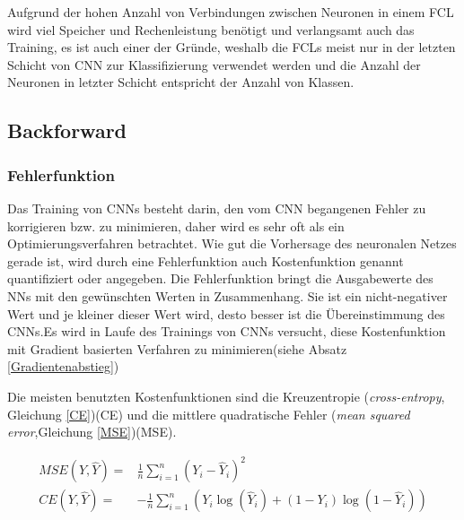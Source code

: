 \documentclass[12pt,a4paper]{scrartcl}
\numberwithin{equation}{section}
\begin{document}
Aufgrund der hohen Anzahl von Verbindungen zwischen Neuronen in einem \ac{FCL} wird viel Speicher und Rechenleistung benötigt und verlangsamt auch das Training, es ist auch einer der Gründe, weshalb die \acsp{FCL} meist nur in der letzten Schicht von \ac{CNN} zur Klassifizierung verwendet werden und die Anzahl der Neuronen in letzter Schicht entspricht der Anzahl von Klassen.









\subsection{Backforward }

\subsubsection{Fehlerfunktion}\label{Fehlerfunktion}

Das Training von \acsp{CNN} besteht darin, den vom \ac{CNN} begangenen Fehler zu korrigieren bzw. zu minimieren, daher wird es sehr oft als ein Optimierungsverfahren betrachtet.
Wie gut die Vorhersage des neuronalen Netzes gerade ist, wird durch eine Fehlerfunktion auch Kostenfunktion genannt quantifiziert oder angegeben.
Die Fehlerfunktion bringt die Ausgabewerte des \acsp{NN} mit den gewünschten Werten in Zusammenhang. Sie ist ein nicht-negativer Wert und je kleiner dieser Wert wird, desto besser ist die Übereinstimmung des \acsp{CNN}.Es wird in Laufe des Trainings von \acsp{CNN} versucht, diese Kostenfunktion mit Gradient basierten Verfahren zu minimieren(siehe Absatz \ref{Gradientenabstieg})


Die meisten benutzten Kostenfunktionen sind die Kreuzentropie (\textit{cross-entropy}, Gleichung \ref{CE})(CE) und die mittlere quadratische Fehler (\textit{mean squared error},Gleichung \ref{MSE})(MSE). 

\begin{align}
\label{MSE}	
MSE(Y, \widehat{Y}) =&\frac{1}{n}\sum_{i = 1}^{n}(Y_i - \widehat{Y}_i)^2\\
\label{CE}
CE(Y, \widehat{Y}) =&-\frac{1}{n}\sum_{i = 1}^{n}(Y_i\log(\widehat{Y}_i) +(1-Y_i)\log(1- \widehat{Y}_i))
\end{align}
\end{document}
